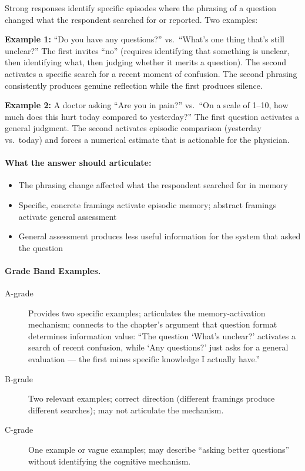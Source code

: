 Strong responses identify specific episodes where the phrasing of a question changed what the respondent searched for or reported. Two examples:

\textbf{Example 1:} ``Do you have any questions?'' vs.\ ``What's one thing that's still unclear?'' The first invites ``no'' (requires identifying that something is unclear, then identifying what, then judging whether it merits a question). The second activates a specific search for a recent moment of confusion. The second phrasing consistently produces genuine reflection while the first produces silence.

\textbf{Example 2:} A doctor asking ``Are you in pain?'' vs.\ ``On a scale of 1--10, how much does this hurt today compared to yesterday?'' The first question activates a general judgment. The second activates episodic comparison (yesterday vs.\ today) and forces a numerical estimate that is actionable for the physician.

\paragraph{What the answer should articulate:}
\begin{itemize}
    \item The phrasing change affected what the respondent searched for in memory
    \item Specific, concrete framings activate episodic memory; abstract framings activate general assessment
    \item General assessment produces less useful information for the system that asked the question
\end{itemize}

\paragraph{Grade Band Examples.}

\begin{description}
    \item[A-grade] Provides two specific examples; articulates the memory-activation mechanism; connects to the chapter's argument that question format determines information value: ``The question `What's unclear?' activates a search of recent confusion, while `Any questions?' just asks for a general evaluation --- the first mines specific knowledge I actually have.''

    \item[B-grade] Two relevant examples; correct direction (different framings produce different searches); may not articulate the mechanism.

    \item[C-grade] One example or vague examples; may describe ``asking better questions'' without identifying the cognitive mechanism.
\end{description}

